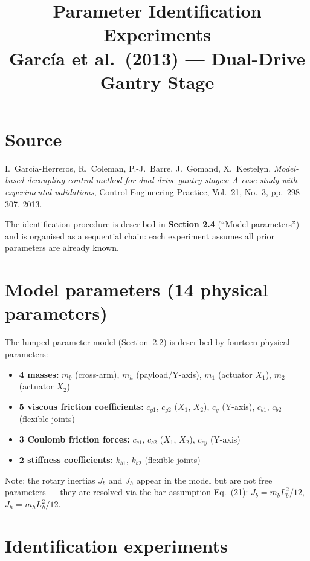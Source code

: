 \documentclass[a4paper, 11pt]{article}
\title{Parameter Identification Experiments\\
\large Garc\'{i}a et al.\ (2013) --- Dual-Drive Gantry Stage}
\author{}
\date{}
\begin{document}
\maketitle

\section*{Source}
I.\ Garc\'{i}a-Herreros, R.\ Coleman, P.-J.\ Barre, J.\ Gomand, X.\ Kestelyn,
\textit{Model-based decoupling control method for dual-drive gantry stages:
A case study with experimental validations},
Control Engineering Practice, Vol.\ 21, No.\ 3, pp.\ 298--307, 2013.

The identification procedure is described in \textbf{Section 2.4} (``Model parameters'')
and is organised as a sequential chain: each experiment assumes all prior parameters
are already known.

\section*{Model parameters (14 physical parameters)}

The lumped-parameter model (Section~2.2) is described by fourteen physical parameters:

\begin{itemize}
    \item \textbf{4 masses:} $m_b$ (cross-arm), $m_h$ (payload/Y-axis), $m_1$ (actuator $X_1$), $m_2$ (actuator $X_2$)
    \item \textbf{5 viscous friction coefficients:} $c_{g1}$, $c_{g2}$ ($X_1$, $X_2$), $c_y$ (Y-axis), $c_{b1}$, $c_{b2}$ (flexible joints)
    \item \textbf{3 Coulomb friction forces:} $c_{c1}$, $c_{c2}$ ($X_1$, $X_2$), $c_{cy}$ (Y-axis)
    \item \textbf{2 stiffness coefficients:} $k_{b1}$, $k_{b2}$ (flexible joints)
\end{itemize}

\noindent Note: the rotary inertias $J_b$ and $J_h$ appear in the model but are not free
parameters --- they are resolved via the bar assumption Eq.~(21):
$J_b = m_b L_b^2 / 12$, $J_h = m_h L_h^2 / 12$.

\section*{Identification experiments}
\end{document}
